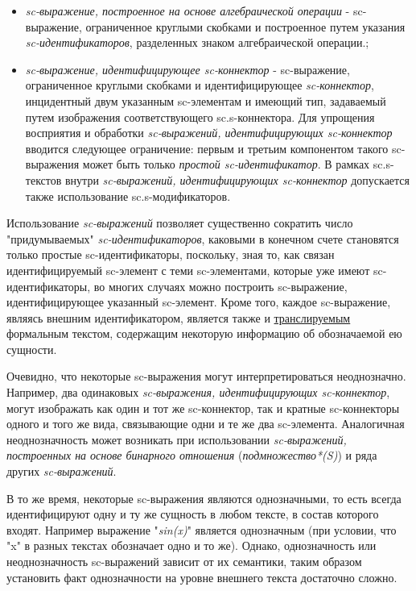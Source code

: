 \begin{itemize}
	\item{\textit{sc-выражение, построенное на основе алгебраической операции} - sc-выражение, ограниченное круглыми скобками и построенное путем указания \textit{sc-идентификаторов}, разделенных знаком алгебраической операции.};
	\item{\textit{sc-выражение, идентифицирующее sc-коннектор} - sc-выражение, ограниченное круглыми скобками и идентифицирующее \textit{sc-коннектор}, инцидентный двум указанным sc-элементам и имеющий тип, задаваемый путем изображения соответствующего sc.s-коннектора.
	Для упрощения восприятия и обработки \textit{sc-выражений, идентифицирующих sc-коннектор} вводится следующее ограничение: первым и третьим компонентом такого sc-выражения может быть только \textit{простой sc-идентификатор}. В рамках sc.s-текстов внутри \textit{sc-выражений, идентифицирующих sc-коннектор} допускается также использование sc.s-модификаторов.}	
\end{itemize}


Использование \textit{sc-выражений} позволяет существенно сократить число "придумываемых" \textit{sc-идентификаторов}, каковыми в конечном счете становятся только простые sc-идентификаторы, поскольку, зная то, как связан идентифицируемый sc-элемент с теми sc-элементами, которые уже имеют sc-идентификаторы, во многих случаях можно построить sc-выражение, идентифицирующее указанный sc-элемент. Кроме того, каждое sc-выражение, являясь внешним идентификатором, является также и \uline{транслируемым} формальным текстом, содержащим некоторую информацию об обозначаемой ею сущности.

Очевидно, что некоторые sc-выражения могут интерпретироваться неоднозначно. Например, два одинаковых \textit{sc-выражения, идентифицирующих sc-коннектор}, могут изображать как один и тот же sc-коннектор, так и кратные sc-коннекторы одного и того же вида, связывающие одни и те же два sc-элемента. Аналогичная неоднозначность может возникать при использовании \textit{sc-выражений, построенных на основе бинарного отношения} (\textit{подмножество*(S)}) и ряда других \textit{sc-выражений}.

В то же время, некоторые sc-выражения являются однозначными, то есть всегда идентифицируют одну и ту же сущность в любом тексте, в состав которого входят. Например выражение "\textit{sin(x)}" является однозначным (при условии, что "x" в разных текстах обозначает одно и то же). Однако, однозначность или неоднозначность sc-выражений зависит от их семантики, таким образом установить факт однозначности на уровне внешнего текста достаточно сложно.

